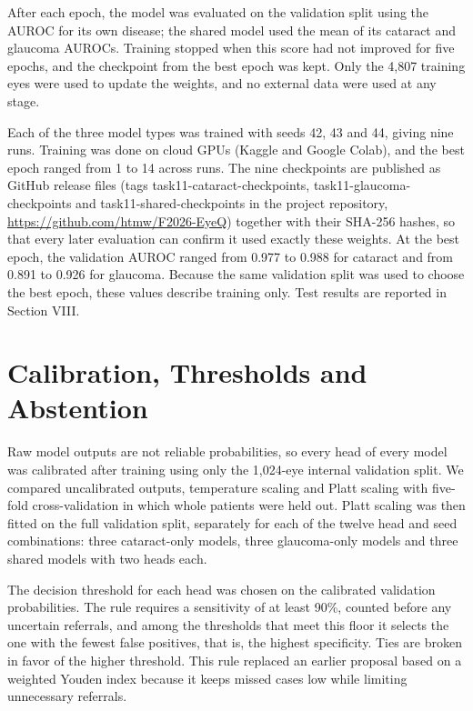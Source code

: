 \documentclass[conference,a4paper]{IEEEtran}
\begin{document}
After each epoch, the model was evaluated on the validation split using the AUROC for its own
disease; the shared model used the mean of its cataract and glaucoma AUROCs. Training stopped when
this score had not improved for five epochs, and the checkpoint from the best epoch was kept. Only
the 4,807 training eyes were used to update the weights, and no external data were used at any
stage.

Each of the three model types was trained with seeds 42, 43 and 44, giving nine runs. Training was
done on cloud GPUs (Kaggle and Google Colab), and the best epoch ranged from 1 to 14 across runs.
The nine checkpoints are published as GitHub release files (tags task11-cataract-checkpoints,
task11-glaucoma-checkpoints and task11-shared-checkpoints in the project repository,
\url{https://github.com/htmw/F2026-EyeQ}) together with their SHA-256 hashes, so that every later
evaluation can confirm it used exactly these weights. At the best epoch, the validation AUROC ranged
from 0.977 to 0.988 for cataract and from 0.891 to 0.926 for glaucoma. Because the same validation
split was used to choose the best epoch, these values describe training only. Test results are
reported in Section VIII.

\section{Calibration, Thresholds and Abstention}

Raw model outputs are not reliable probabilities, so every head of every model was calibrated after
training using only the 1,024-eye internal validation split. We compared uncalibrated outputs,
temperature scaling \cite{ref20} and Platt scaling \cite{ref28} with five-fold cross-validation in
which whole patients were held out. Platt scaling was then fitted on the full validation split,
separately for each of the twelve head and seed combinations: three cataract-only models, three
glaucoma-only models and three shared models with two heads each.

The decision threshold for each head was chosen on the calibrated validation probabilities. The rule
requires a sensitivity of at least 90\%, counted before any uncertain referrals, and among the
thresholds that meet this floor it selects the one with the fewest false positives, that is, the
highest specificity. Ties are broken in favor of the higher threshold. This rule replaced an
earlier proposal based on a weighted Youden index because it keeps missed cases low while limiting
unnecessary referrals.
\end{document}
